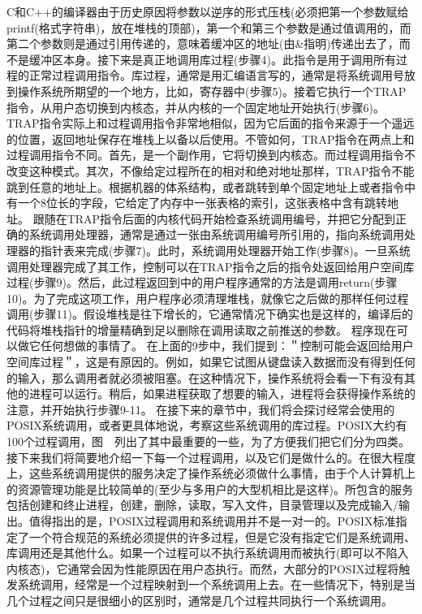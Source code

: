 	C和C++的编译器由于历史原因将参数以逆序的形式压栈(必须把第一个参数赋给printf(格式字符串)，放在堆栈的顶部)，第一个和第三个参数是通过值调用的，而第二个参数则是通过引用传递的，意味着缓冲区的地址(由\&指明)传递出去了，而不是缓冲区本身。接下来是真正地调用库过程(步骤4)。此指令是用于调用所有过程的正常过程调用指令。库过程，通常是用汇编语言写的，通常是将系统调用号放到操作系统所期望的一个地方，比如，寄存器中(步骤5)。接着它执行一个TRAP指令，从用户态切换到内核态，并从内核的一个固定地址开始执行(步骤6)。TRAP指令实际上和过程调用指令非常地相似，因为它后面的指令来源于一个遥远的位置，返回地址保存在堆栈上以备以后使用。不管如何，TRAP指令在两点上和过程调用指令不同。首先，是一个副作用，它将切换到内核态。而过程调用指令不改变这种模式。其次，不像给定过程所在的相对和绝对地址那样，TRAP指令不能跳到任意的地址上。根据机器的体系结构，或者跳转到单个固定地址上或者指令中有一个8位长的字段，它给定了内存中一张表格的索引，这张表格中含有跳转地址。
	跟随在TRAP指令后面的内核代码开始检查系统调用编号，并把它分配到正确的系统调用处理器，通常是通过一张由系统调用编号所引用的，指向系统调用处理器的指针表来完成(步骤7)。此时，系统调用处理器开始工作(步骤8)。一旦系统调用处理器完成了其工作，控制可以在TRAP指令之后的指令处返回给用户空间库过程(步骤9)。然后，此过程返回到中的用户程序通常的方法是调用return(步骤10)。为了完成这项工作，用户程序必须清理堆栈，就像它之后做的那样任何过程调用(步骤11)。假设堆栈是往下增长的，它通常情况下确实也是这样的，编译后的代码将堆栈指针的增量精确到足以删除在调用读取之前推送的参数。
	程序现在可以做它任何想做的事情了。
	在上面的9步中，我们提到：＂控制可能会返回给用户空间库过程＂，这是有原因的。例如，如果它试图从键盘读入数据而没有得到任何的输入，那么调用者就必须被阻塞。在这种情况下，操作系统将会看一下有没有其他的进程可以运行。稍后，如果进程获取了想要的输入，进程将会获得操作系统的注意，并开始执行步骤9-11。
	在接下来的章节中，我们将会探讨经常会使用的POSIX系统调用，或者更具体地说，考察这些系统调用的库过程。POSIX大约有100个过程调用，图　列出了其中最重要的一些，为了方便我们把它们分为四类。接下来我们将简要地介绍一下每一个过程调用，以及它们是做什么的。在很大程度上，这些系统调用提供的服务决定了操作系统必须做什么事情，由于个人计算机上的资源管理功能是比较简单的(至少与多用户的大型机相比是这样)。所包含的服务包括创建和终止进程，创建，删除，读取，写入文件，目录管理以及完成输入/输出。值得指出的是，POSIX过程调用和系统调用并不是一对一的。POSIX标准指定了一个符合规范的系统必须提供的许多过程，但是它没有指定它们是系统调用、库调用还是其他什么。如果一个过程可以不执行系统调用而被执行(即可以不陷入内核态)，它通常会因为性能原因在用户态执行。而然，大部分的POSIX过程将触发系统调用，经常是一个过程映射到一个系统调用上去。在一些情况下，特别是当几个过程之间只是很细小的区别时，通常是几个过程共同执行一个系统调用。
	
